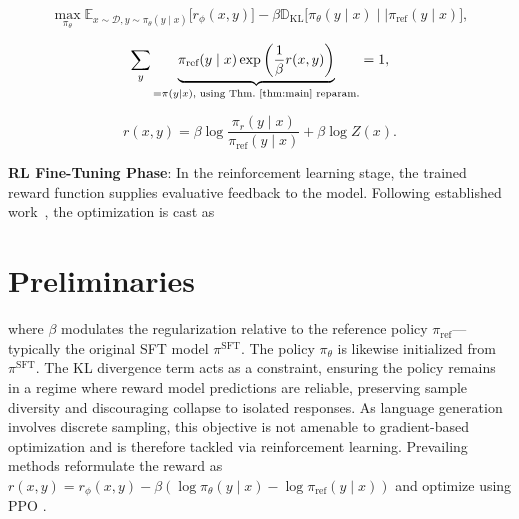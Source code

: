 \begin{equation}\label{eq:RL}
\max_{\pi_{\theta}}  \mathbb{E}_{x\sim \mathcal{D}, y\sim \pi_{\theta}(y \mid x)}\bigl[r_{\phi}(x, y)\bigr] - \beta\mathbb{D}_{\textrm{KL}}\bigl[\pi_{\theta}(y\mid x)\mid \mid \pi_\text{ref}(y\mid x)\bigr],
\end{equation}

\begin{equation}\label{eq:lag_p}
     \sum_{y}\underbrace{\pi_\text{ref}(y\mid x)\exp\left(\frac{1}{\beta}r(x, y)\right)}_{=\pi(y\mid x)\text{, using Thm.~\ref{thm:main} reparam.}} = 1,
\end{equation}

\begin{equation}\label{eq:main_eq}
    r(x,y) =\beta \log \frac{\pi_r(y\mid x)}{\pi_\text{ref}(y\mid x)} + \beta \log Z(x).
\end{equation}

\textbf{RL Fine-Tuning Phase}: In the reinforcement learning stage, the trained reward function supplies evaluative feedback to the model. Following established work~\citep{jaques2017sequence, jaques2020human}, the optimization is cast as

\section{Preliminaries}\label{section:prelims}

where $\beta$ modulates the regularization relative to the reference policy $\pi_\text{ref}$—typically the original SFT model $\pi^\text{SFT}$. The policy $\pi_\theta$ is likewise initialized from $\pi^\text{SFT}$. The KL divergence term acts as a constraint, ensuring the policy remains in a regime where reward model predictions are reliable, preserving sample diversity and discouraging collapse to isolated responses. As language generation involves discrete sampling, this objective is not amenable to gradient-based optimization and is therefore tackled via reinforcement learning. Prevailing methods \citep{ziegler2020finetuning, stiennon2022learning, bai2022training, ouyang2022training} reformulate the reward as ${r(x, y) = r_{\phi}(x, y) -\beta (\log \pi_{\theta}(y\mid x) - \log \pi_\text{ref}(y\mid x))}$ and optimize using PPO \cite{schulman2017proximal}. 